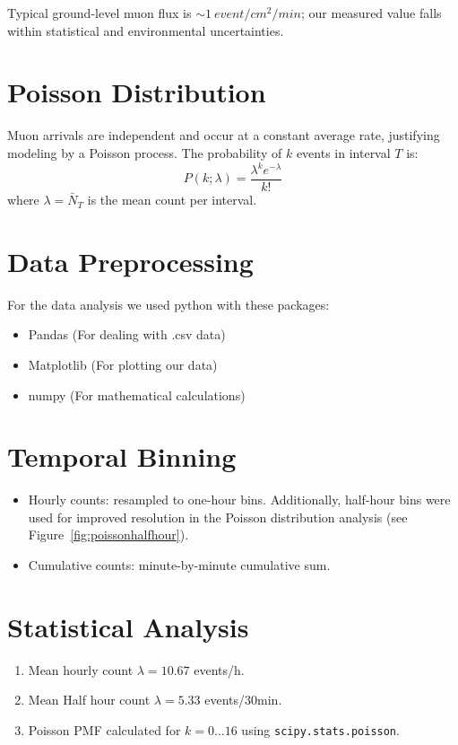 \documentclass[12pt]{article}
\begin{document}
	Typical ground-level muon flux is $\sim\SI{1}{event/cm^2/min}$; our measured value falls within statistical and environmental uncertainties.
	
	\section{Poisson Distribution}
	Muon arrivals are independent and occur at a constant average rate, justifying modeling by a Poisson process. The probability of $k$ events in interval $T$ is:
	\[
	P(k;\lambda) = \frac{\lambda^k e^{-\lambda}}{k!}
	\]
	where $\lambda = \bar{N}_T$ is the mean count per interval.
	
	\section{Data Preprocessing}
	For the data analysis we used python with these packages:
	 \begin{itemize}
	 	\item Pandas (For dealing with .csv data)
	 	\item Matplotlib (For plotting our data)
	 	\item numpy (For mathematical calculations)
	\end{itemize}
	
	\section{Temporal Binning}
	\begin{itemize}
		\item Hourly counts: resampled to one-hour bins. Additionally, half-hour bins were used for improved resolution in the Poisson distribution analysis (see Figure~\ref{fig:poissonhalfhour}).
		\item Cumulative counts: minute-by-minute cumulative sum.
	\end{itemize}
	
	\section{Statistical Analysis}
	\begin{enumerate}
		\item Mean hourly count $\lambda = 10.67$ events/h.
		\item Mean Half hour count $\lambda= 5.33$ events/30min.
		\item Poisson PMF calculated for $k=0\ldots16$ using \texttt{scipy.stats.poisson}.
	\end{enumerate}
	
\end{document}
